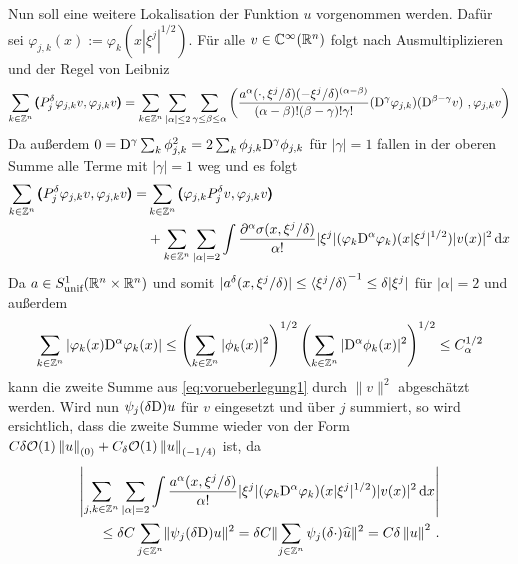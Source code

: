 Nun soll eine weitere Lokalisation der Funktion $u$ vorgenommen werden. Dafür sei $\varphi_{j,k}(x):=\varphi_k(x|\xi^j|^{1/2})$. Für alle $v\in\mathbb C^\infty(\mathbb R^n)$ folgt nach Ausmultiplizieren und der Regel von Leibniz
\begin{align}
\sum_{k\in\Z^n}\spro {P^\delta_j\varphi_{j,k}v} {\varphi_{j,k}v} = \sum_{k\in\Z^n}\sum_{|\alpha|\le 2}\sum_{\gamma\le\beta\le\alpha} \left({\frac{a^\alpha(\cdot,\xi^j/\delta)(-\xi^j/\delta)^{(\alpha-\beta)}}{(\alpha-\beta)!(\beta-\gamma)!\gamma!}(\D^\gamma\varphi_{j,k})(\D^{\beta-\gamma}v)}\ , {\varphi_{j,k}v}\right)
\end{align}
Da außerdem $0=\mathrm D^\gamma\sum_k\phi_{j,k}^2 = 2 \sum_k\phi_{j,k}\mathrm D^\gamma\phi_{j,k}$ für $|\gamma|=1$ fallen in der oberen Summe alle Terme mit $|\gamma|=1$ weg und es folgt
\begin{align}\label{eq:vorueberlegung1}
\begin{split}
\sum_{k\in\mathbb Z^n}\pmb(P^\delta_j\varphi_{j,k}v,\varphi_{j,k}v\pmb) = &\sum_{k\in\mathbb Z^n}\pmb(\varphi_{j,k}P^\delta_jv,\varphi_{j,k}v\pmb) \\&+ \sum_{k\in\mathbb Z^n}\sum_{|\alpha|=2}\int \frac{\partial^\alpha\sigma(x,\xi^j/\delta)}{\alpha!} |\xi^j|(\varphi_k\mathrm D^\alpha\varphi_k)(x|\xi^j|^{1/2})|v(x)|^2\,\mathrm d x
\end{split}
\end{align}
Da $a\in S^1_\text{unif}(\mathbb R^n\times\mathbb R^n)$ und somit $|a^\delta(x,\xi^j/\delta)|\le\braket{\xi^j/\delta}^{-1}\le \delta|\xi^j|$ für $|\alpha|=2$ und außerdem
\begin{align}
\sum_{k\in\mathbb Z^n} |\varphi_k(x)\mathrm D^\alpha\varphi_k(x)|\le \left(\sum_{k\in\mathbb Z^n}|\phi_k(x)|^2\right)^{1/2}\left(\sum_{k\in\mathbb Z^n}|\mathrm D^\alpha\phi_k(x)|^2\right)^{1/2}\le C_\alpha^{1/2}
\end{align}
kann die zweite Summe aus \eqref{eq:vorueberlegung1} durch $\|v\|^2$ abgeschätzt werden. Wird nun $\psi_j(\delta\mathrm D)u$ für $v$ eingesetzt und über $j$ summiert, so wird ersichtlich, dass die zweite Summe wieder von der Form $C\delta \mathcal{O}(1) \left\lVert u\right\rVert_{(0)} + C_\delta \mathcal O(1)\left\lVert u\right\rVert_{(-1/4)}$ ist, da
\begin{align}
\begin{split}
\left|\sum_{j,k\in\mathbb Z^n}\sum_{|\alpha|=2}\int \frac{a^\alpha(x,\xi^j/\delta)}{\alpha!} |\xi^j|(\varphi_k\mathrm D^\alpha\varphi_k)(x|\xi^j|^{1/2})|v(x)|^2\,\mathrm d x\right|\\ \le \delta C \sum_{j\in\mathbb Z^n} \lVert\psi_j(\delta\mathrm D)u\rVert^2 = \delta C \lVert\sum_{j\in\mathbb Z^n} \psi_j(\delta \cdot)\widehat u\rVert^2 = C \delta \left\lVert u\right\rVert ^2\,.
\end{split}
\end{align}

